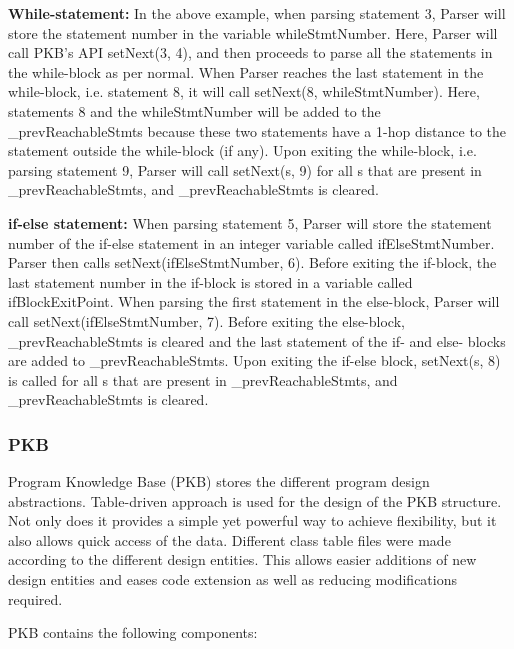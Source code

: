 \documentclass[12pt]{article}
\begin{document}
\textbf{While-statement:}
In the above example, when parsing statement 3, Parser will store the statement number in the variable whileStmtNumber. Here, Parser will call PKB’s API setNext(3, 4), and then proceeds to parse all the statements in the while-block as per normal. When Parser reaches the last statement in the while-block, i.e. statement 8, it will call setNext(8, whileStmtNumber). Here, statements 8 and the whileStmtNumber will be added to the \_prevReachableStmts because these two statements have a 1-hop distance to the statement outside the while-block (if any). Upon exiting the while-block, i.e. parsing statement 9, Parser will call setNext(s, 9) for all s that are present in \_prevReachableStmts, and \_prevReachableStmts is cleared. \newline

\textbf{if-else statement:}
When parsing statement 5, Parser will store the statement number of the if-else statement in an integer variable called ifElseStmtNumber. Parser then calls setNext(ifElseStmtNumber, 6). Before exiting the if-block, the last statement number in the if-block is stored in a variable called ifBlockExitPoint. When parsing the first statement in the else-block, Parser will call setNext(ifElseStmtNumber, 7). Before exiting the else-block, \_prevReachableStmts is cleared and the last statement of the if- and else- blocks are added to \_prevReachableStmts. Upon exiting the if-else block, setNext(s, 8) is called for all s that are present in \_prevReachableStmts, and \_prevReachableStmts is cleared.

\subsubsection{PKB}
Program Knowledge Base (PKB) stores the different program design abstractions. Table-driven approach is used for the design of the PKB structure. Not only does it provides a simple yet powerful way to achieve flexibility, but it also allows quick access of the data. Different class table files were made according to the different design entities. This allows easier additions of new design entities and eases code extension as well as reducing modifications required.
\newline 

PKB contains the following components:
\end{document}

